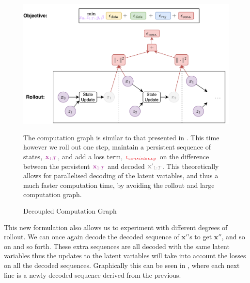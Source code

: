 \begin{figure}
    \centering
    \includegraphics[width=1\textwidth]{Figures/humor/improvement/computation_graph_dimm.png}
    \caption{Decoupled Computation Graph}
    \label{fig:dimm_rollout_graph}
    \medskip
    \small
    The computation graph is similar to that presented in . This time however we roll out one step, maintain a persistent sequence of states, $\textcolor{Mulberry}{\mathbf{x}_{1:T}}$, and add a loss term, $\textcolor{Red}{\epsilon_{consistency}}$ on the difference between the persistent $\textcolor{Mulberry}{\mathbf{x}_{1:T}}$ and decoded $\textcolor{Gray}{\mathbf{x'}_{1:T}}$. This theoretically allows for parallelised decoding of the latent variables, and thus a much faster computation time, by avoiding the rollout and large computation graph.
\end{figure}

This new formulation also allows us to experiment with different degrees of rollout. We can once again decode the decoded sequence of $\mathbf{x'}$'s to get $\mathbf{x''}$, and so on and so forth. These extra sequences are all decoded with the same latent variables thus the updates to the latent variables will take into account the losses on all the decoded sequences. Graphically this can be seen in , where each next line is a newly decoded sequence derived from the previous.


